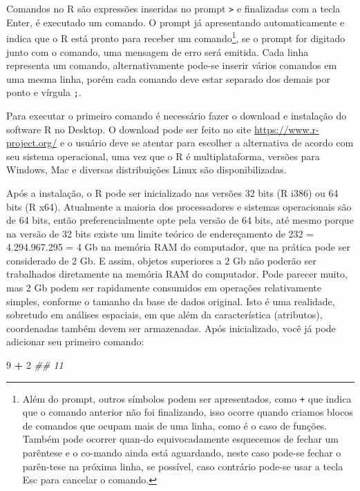 \documentclass[
  11pt,
  a5paper,
  openany]{book}
\newenvironment{Shaded}{\begin{snugshade}}{\end{snugshade}}
\newcommand{\CommentTok}[1]{\textcolor[rgb]{0.56,0.35,0.01}{\textit{#1}}}
\newcommand{\DecValTok}[1]{\textcolor[rgb]{0.00,0.00,0.81}{#1}}
\newcommand{\OperatorTok}[1]{\textcolor[rgb]{0.81,0.36,0.00}{\textbf{#1}}}
\newcommand{\StringTok}[1]{\textcolor[rgb]{0.31,0.60,0.02}{#1}}
\begin{document}
Comandos no R são expressões inseridas no prompt \texttt{\textgreater{}} e finalizadas com a tecla Enter, é executado um comando. O prompt já apresentando automaticamente e indica que o R está pronto para receber um comando\footnote{Além do prompt, outros símbolos podem ser apresentados, como \texttt{+} que indica que o comando anterior não foi finalizando, isso ocorre quando criamos blocos de comandos que ocupam mais de uma linha, como é o caso de funções. Também pode ocorrer quan-do equivocadamente esquecemos de fechar um parêntese e o co-mando ainda está aguardando, neste caso pode-se fechar o parên-tese na próxima linha, se possível, caso contrário pode-se usar a tecla Esc para cancelar o comando.}, se o prompt for digitado junto com o comando, uma mensagem de erro será emitida. Cada linha representa um comando, alternativamente pode-se inserir vários comandos em uma mesma linha, porém cada comando deve estar separado dos demais por ponto e vírgula \texttt{;}.

Para executar o primeiro comando é necessário fazer o download e instalação do software R no Desktop. O download pode ser feito no site \url{https://www.r-project.org/} e o usuário deve se atentar para escolher a alternativa de acordo com seu sistema operacional, uma vez que o R é multiplataforma, versões para Windows, Mac e diversas distribuições Linux são disponibilizadas.

Após a instalação, o R pode ser inicializado nas versões 32 bits (R i386) ou 64 bits (R x64). Atualmente a maioria dos processadores e sistemas operacionais são de 64 bits, então preferencialmente opte pela versão de 64 bits, até mesmo porque na versão de 32 bits existe um limite teórico de endereçamento de 232 = 4.294.967.295 = 4 Gb na memória RAM do computador, que na prática pode ser considerado de 2 Gb. E assim, objetos superiores a 2 Gb não poderão ser trabalhados diretamente na memória RAM do computador. Pode parecer muito, mas 2 Gb podem ser rapidamente consumidos em operações relativamente simples, conforme o tamanho da base de dados original. Isto é uma realidade, sobretudo em análises espaciais, em que além da característica (atributos), coordenadas também devem ser armazenadas.
Após inicializado, você já pode adicionar seu primeiro comando:

\begin{Shaded}
\begin{Highlighting}[]
\DecValTok{9} \OperatorTok{+}\StringTok{ }\DecValTok{2}
\CommentTok{## 11}
\end{Highlighting}
\end{Shaded}
\end{document}
